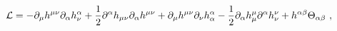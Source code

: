 \begin{equation}
\mathcal{L}=-\partial _{\mu }h^{\mu \nu }\partial _{\alpha }h_{\nu }^{\alpha
}+\frac{1}{2}\partial ^{\alpha }h_{\mu \nu }\partial _{\alpha }h^{\mu \nu
}+\partial _{\mu }h^{\mu \nu }\partial _{\nu }h_{\alpha }^{\alpha }-\frac{1}{%
2}\partial _{\alpha }h_{\mu }^{\mu }\partial ^{\alpha }h_{\nu }^{\nu
}+h^{\alpha \beta }\Theta _{\alpha \beta }\ ,  \label{hlag}
\end{equation}%
